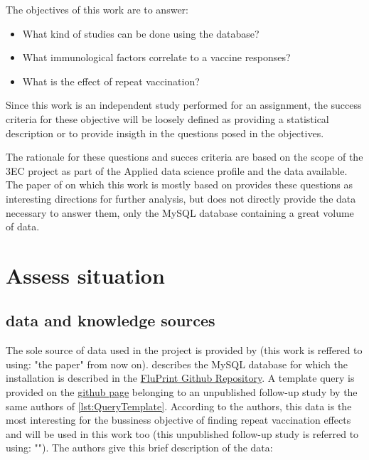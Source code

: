 The objectives of this work are to answer:
\begin{itemize}
        \item What kind of studies can be done using the \flup database?
        \item What immunological factors correlate to a vaccine responses?
        \item What is the effect of repeat vaccination?
\end{itemize}

Since this work is an independent study performed for an assignment, the
success criteria for these objective will be loosely defined as providing a
statistical description or to provide insigth in the questions posed in the
objectives.

The rationale for these questions and succes criteria  are based on the scope
of the 3EC project as part of the Applied data science profile and the data
available. The paper of \cite{tomicFluPRINTDatasetMultidimensional2019} on
which this work is mostly based on provides these questions as interesting
directions for further analysis, but does not directly provide the data
necessary to answer them, only the MySQL database containing a great volume of
data.

\section{Assess situation}

\subsection{data and knowledge sources}

The sole source of data used in the project is provided by
\cite{tomicFluPRINTDatasetMultidimensional2019} (this work is reffered to
using: "the \flup paper" from now on). \Dpaper describes the MySQL database for
which the installation is described in the
\href{https://github.com/LogIN-/fluprint}{FluPrint Github Repository}. A
template query is provided on the
\href{https://github.com/LogIN-/simon-manuscript}{github page} belonging to an
unpublished follow-up study by the same authors of \dpaper
\autoref{lst:QueryTemplate}.  According to the authors, this data is the most
interesting for the bussiness objective of finding repeat vaccination effects
and will be used in this work too (this
unpublished follow-up study is referred to using: "\spaper"). The authors give this brief
description of the data:


